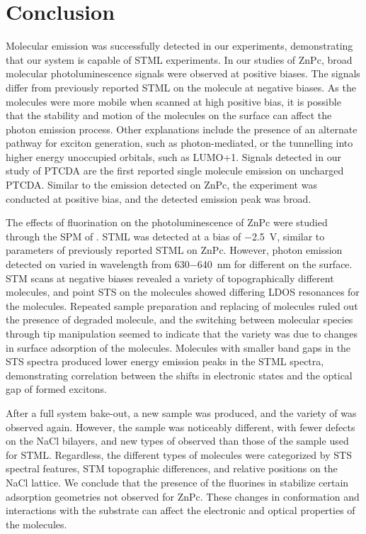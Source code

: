 
\chapter{Conclusion}
\label{ch:conc}


Molecular emission was successfully detected in our experiments, demonstrating that our system is capable of \ac{STML} experiments. In our studies of \ac{ZnPc}, broad molecular photoluminescence signals were observed at positive biases. The signals differ from previously reported \ac{STML} on the molecule at negative biases. As the molecules were more mobile when scanned at high positive bias, it is possible that the stability and motion of the molecules on the surface can affect the photon emission process. Other explanations include the presence of an alternate pathway for exciton generation, such as photon-mediated, or the tunnelling into higher energy unoccupied orbitals, such as LUMO+1. Signals detected in our study of \ac{PTCDA} are the first reported single molecule emission on uncharged \ac{PTCDA}. Similar to the emission detected on \ac{ZnPc}, the experiment was conducted at positive bias, and the detected emission peak was broad.

The effects of fluorination on the photoluminescence of ZnPc were studied through the \ac{SPM} of . \ac{STML} was detected at a bias of \SI{-2.5}{V}, similar to parameters of previously reported \ac{STML} on ZnPc. However, photon emission detected on  varied in wavelength from 630\SI{-640}{nm} for different  on the surface. \ac{STM} scans at negative biases revealed a variety of topographically different molecules, and point \ac{STS} on the molecules showed differing \ac{LDOS} resonances for the molecules. Repeated sample preparation and replacing of molecules ruled out the presence of degraded molecule, and the switching between molecular species through tip manipulation seemed to indicate that the variety was due to changes in surface adsorption of the molecules. Molecules with smaller band gaps in the \ac{STS} spectra produced lower energy emission peaks in the \ac{STML} spectra, demonstrating correlation between the shifts in electronic states and the optical gap of formed excitons.

After a full system bake-out, a new sample was produced, and the variety of  was observed again. However, the sample was noticeably different, with fewer defects on the NaCl bilayers, and new types of  observed than those of the sample used for \ac{STML}. Regardless, the different types of molecules were categorized by \ac{STS} spectral features, \ac{STM} topographic differences, and relative positions on the NaCl lattice. We conclude that the presence of the fluorines in  stabilize certain adsorption geometries not observed for ZnPc. These changes in conformation and interactions with the substrate can affect the electronic and optical properties of the molecules.

